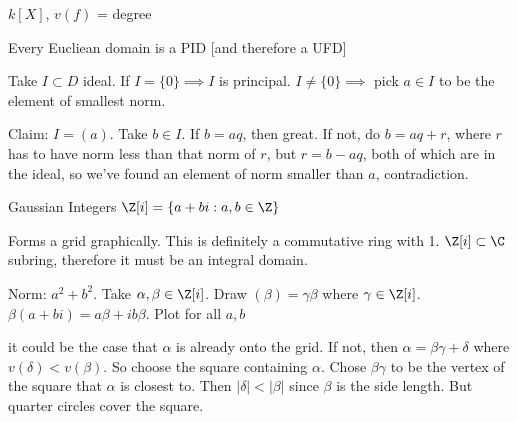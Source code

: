 \documentclass[twoside, 10pt]{article}
\begin{document}
\begin{exm*}
    $k[X]$, $v(f)$ = degree
\end{exm*}

\begin{thm}
    Every Eucliean domain is a PID [and therefore a UFD]
\end{thm}
Take $I \subset D$ ideal. If $I = \{0\} \implies I$ is principal. $I \neq \{0\} \implies$ pick $a \in I$ to be the element of smallest norm.

Claim: $I = (a)$. Take $b \in I$. If $b = aq$, then great. If not, do $b = aq + r$, where $r$ has to have norm less than that norm of $r$, but $r = b - aq$, both of which are in the ideal, so we've found an element of norm smaller than $a$, contradiction.

\begin{exm*}
    Gaussian Integers $\Z[i] = \{a + bi: a, b \in \Z\}$
\end{exm*}
Forms a grid graphically. This is definitely a commutative ring with 1. $\Z[i] \subset \C$ subring, therefore it must be an integral domain.

Norm: $a^2 + b^2$. Take $\alpha, \beta \in \Z[i]$. Draw $(\beta) = \gamma\beta$ where $\gamma \in \Z[i]$. $\beta(a + bi) = a\beta + i b \beta$. Plot for all $a, b$

it could be the case that $\alpha$ is already onto the grid. If not, then $\alpha = \beta\gamma + \delta$ where $v(\delta) < v(\beta)$. So choose the square containing $\alpha$. Chose $\beta\gamma$ to be the vertex of the square that $\alpha$ is closest to. Then $|\delta| < |\beta|$ since $\beta$ is the side length. But quarter circles cover the square.
\end{document}
